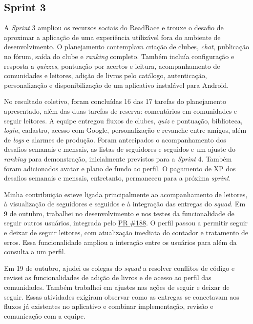 \clearpage
\subsection{Sprint 3}
A \textit{Sprint} 3 ampliou os recursos sociais do ReadRace e trouxe o desafio de aproximar a aplicação de uma experiência utilizável fora do ambiente de desenvolvimento. O planejamento contemplava criação de clubes, \textit{chat}, publicação no fórum, saída do clube e \textit{ranking} completo. Também incluía configuração e resposta a \textit{quizzes}, pontuação por acertos e leitura, acompanhamento de comunidades e leitores, adição de livros pelo catálogo, autenticação, personalização e disponibilização de um aplicativo instalável para Android.

No resultado coletivo, foram concluídas 16 das 17 tarefas do planejamento apresentado, além das duas tarefas de reserva: comentários em comunidades e seguir leitores. A equipe entregou fluxos de clubes, \textit{quiz} e pontuação, biblioteca, \textit{login}, cadastro, acesso com Google, personalização e revanche entre amigos, além de \textit{logs} e alarmes de produção. Foram antecipados o acompanhamento dos desafios semanais e mensais, as listas de seguidores e seguidos e um ajuste do \textit{ranking} para demonstração, inicialmente previstos para a \textit{Sprint} 4. Também foram adicionados avatar e plano de fundo ao perfil. O pagamento de \ac{XP} dos desafios semanais e mensais, entretanto, permaneceu para a próxima \textit{sprint}.

Minha contribuição esteve ligada principalmente ao acompanhamento de leitores, à visualização de seguidores e seguidos e à integração das entregas do \textit{squad}. Em 9 de outubro, trabalhei no desenvolvimento e nos testes da funcionalidade de seguir outros usuários, integrada pelo \href{https://github.com/ReadRace-AGES/ReadRace/pull/188}{PR \#188}. O perfil passou a permitir seguir e deixar de seguir leitores, com atualização imediata do contador e tratamento de erros. Essa funcionalidade ampliou a interação entre os usuários para além da consulta a um perfil.

Em 19 de outubro, ajudei os colegas do \textit{squad} a resolver conflitos de código e revisei as funcionalidades de adição de livros e de acesso ao perfil das comunidades. Também trabalhei em ajustes nas ações de seguir e deixar de seguir. Essas atividades exigiram observar como as entregas se conectavam aos fluxos já existentes no aplicativo e combinar implementação, revisão e comunicação com a equipe.


